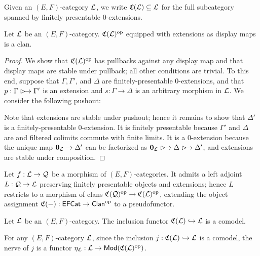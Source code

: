 \documentclass[a4paper]{article}
\begin{document}
\begin{definition}
  Given an $(E,F)$-category $\mathcal{L}$, we write $\mathfrak{C}(\mathcal{L}) \subseteq \mathcal{L}$ for the full subcategory spanned by finitely presentable $0$-extensions.
\end{definition}

\begin{lemma}
  Let $\mathcal{L}$ be an $(E,F)$-category.
  $\mathfrak{C}(\mathcal{L})^{\mathrm{op}}$ equipped with extensions as display maps is a clan.
\end{lemma}
\begin{proof}
  We show that $\mathfrak{C}(\mathcal{L})^{\mathrm{op}}$ has pullbacks against any display map and that display maps are stable under pullback; all other conditions are trivial.
  To this end, suppose that $\Gamma, \Gamma'$, and $\Delta$ are finitely-presentable 0-extensions, and that $p : \Gamma \extension \Gamma'$ is an extension and $s : \Gamma \to \Delta$ is an arbitrary morphism in $\mathcal{L}$.
  We consider the following pushout:
  \begin{center}
  \end{center}
  Note that extensions are stable under pushout; hence it remains to show that $\Delta'$ is a finitely-presentable 0-extension.
  It is finitely presentable because $\Gamma'$ and $\Delta$ are and filtered colimits commute with finite limits.
  It is a 0-extension because the unique map $\mathbf{0}_{\mathcal{L}} \to \Delta'$ can be factorized as $\initObj{\cL} \extension \Delta \extension \Delta'$, and extensions are stable under composition.
\end{proof}

\begin{construction}
  Let $f : \mathcal{L} \to \mathcal{Q}$ be a morphism of $(E,F)$-categories.
  It admits a left adjoint $L : \mathcal{Q} \to \mathcal{L}$ preserving finitely presentable objects and extensions; hence $L$ restricts to a morphism of clans $\mathfrak{C}(\mathcal{Q})^{\mathrm{op}} \to \mathfrak{C}(\mathcal{L})^{\mathrm{op}}$, extending the object assignment $\mathfrak{C}(-) : \mathsf{EFCat} \to \mathsf{Clan}^{\mathrm{op}}$ to a pseudofunctor.
\end{construction}

\begin{lemma}
  Let $\mathcal{L}$ be an $(E,F)$-category.
  The inclusion functor $\mathfrak{C}(\mathcal{L}) \hookrightarrow \mathcal{L}$ is a comodel.
\end{lemma}

\begin{construction}
  For any $(E,F)$-category $\mathcal{L}$, since the inclusion $j : \mathfrak{C}(\mathcal{L}) \hookrightarrow \mathcal{L}$ is a comodel, the nerve of $j$ is a functor $\eta_{\mathcal{L}} : \mathcal{L} \to \mathsf{Mod}(\mathfrak{C}(\mathcal{L})^{\mathrm{op}})$.
\end{construction}
\end{document}
